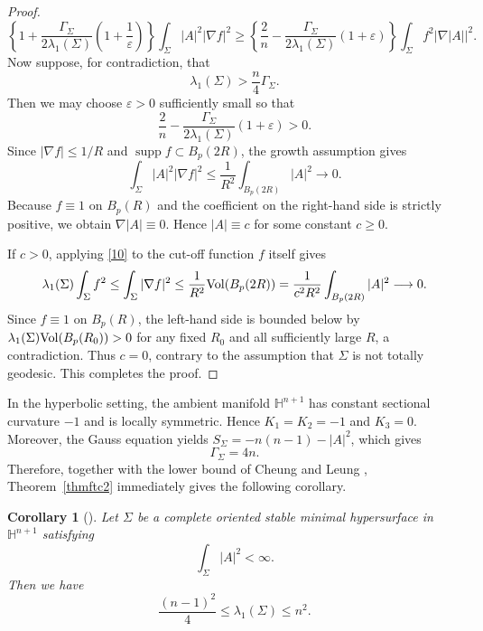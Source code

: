 \documentclass[amssymb,amstex,amsmath,11pt]{article}
\numberwithin{equation}{section}
\renewcommand{\epsilon}{\varepsilon}
\theoremstyle{plain}
\newtheorem{cor}[thm]{Corollary}
\theoremstyle{definition}
\theoremstyle{remark}
\newcommand{\Vol}{{\rm Vol}}
\begin{document}
\begin{proof}
  \begin{equation*}
\left\{
1+\frac{\Gamma_\Sigma}{2\lambda_1(\Sigma)}\left(1+\frac{1}{\epsilon}\right)
\right\}
\int_\Sigma |A|^2|\nabla f|^2
\ge
\left\{
\frac{2}{n}-\frac{\Gamma_\Sigma}{2\lambda_1(\Sigma)}(1+\epsilon)
\right\}
\int_\Sigma f^2|\nabla |A||^2.
\end{equation*}
Now suppose, for contradiction, that
$$
\lambda_1(\Sigma)>\frac{n}{4}\Gamma_\Sigma.
$$
Then we may choose $\epsilon>0$ sufficiently small so that
$$
\frac{2}{n}-\frac{\Gamma_\Sigma}{2\lambda_1(\Sigma)}(1+\epsilon)>0.
$$
Since $|\nabla f|\le 1/R$ and $\operatorname{supp}f\subset B_p(2R)$, the growth assumption gives
$$
\int_\Sigma |A|^2|\nabla f|^2
\le
\frac{1}{R^2}\int_{B_p(2R)}|A|^2\longrightarrow0.
$$
  Because $f\equiv1$ on $B_p(R)$ and the coefficient on the right-hand side is strictly positive, we obtain $\nabla|A|\equiv0$. Hence $|A|\equiv c$ for some constant $c\ge0$.

If $c>0$, applying \eqref{10} to the cut-off function $f$ itself gives
$$
\lambda_1(\Sigma)\int_\Sigma f^2
\le
\int_\Sigma|\nabla f|^2
\le
\frac{1}{R^2}\Vol(B_p(2R))
=
\frac{1}{c^2R^2}\int_{B_p(2R)}|A|^2\longrightarrow0.
$$
Since $f\equiv1$ on $B_p(R)$, the left-hand side is bounded below by $\lambda_1(\Sigma)\Vol(B_p(R_0))>0$ for any fixed $R_0$ and all sufficiently large $R$, a contradiction. Thus $c=0$, contrary to the assumption that $\Sigma$ is not totally geodesic. This completes the proof.
\end{proof}



In the hyperbolic setting, the ambient manifold $\mathbb{H}^{n+1}$ has constant sectional curvature $-1$ and is locally symmetric. Hence $K_1=K_2=-1$ and $K_3=0$. Moreover, the Gauss equation yields $S_\Sigma=-n(n-1)-|A|^2$, which gives
$$\Gamma_\Sigma = 4n.$$
Therefore, together with the lower bound of Cheung and Leung \cite{C&L01}, Theorem~\ref{thmftc2} immediately gives the following corollary.
\begin{cor}[\cite{Seo11}]\label{S}
Let $\Sigma$ be a complete oriented stable minimal hypersurface in $\mathbb{H}^{n+1}$ satisfying
$$
\int_\Sigma |A|^2<\infty.
$$
Then we have
$$
\frac{(n-1)^2}{4}\le \lambda_1(\Sigma)\le n^2.
$$
\end{cor}
\end{document}
